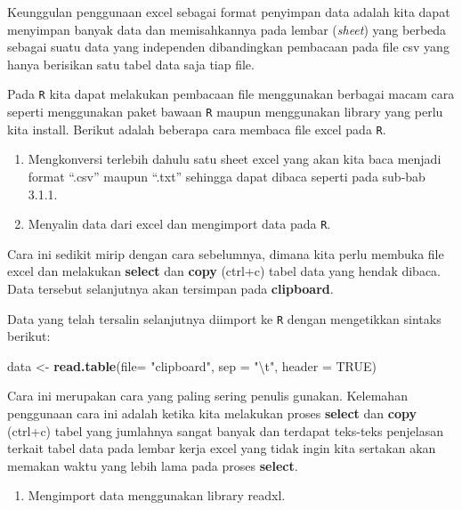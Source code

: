 \documentclass[]{book}
\newenvironment{Shaded}{\begin{snugshade}}{\end{snugshade}}
\newcommand{\KeywordTok}[1]{\textcolor[rgb]{0.13,0.29,0.53}{\textbf{#1}}}
\newcommand{\DataTypeTok}[1]{\textcolor[rgb]{0.13,0.29,0.53}{#1}}
\newcommand{\CharTok}[1]{\textcolor[rgb]{0.31,0.60,0.02}{#1}}
\newcommand{\StringTok}[1]{\textcolor[rgb]{0.31,0.60,0.02}{#1}}
\newcommand{\OtherTok}[1]{\textcolor[rgb]{0.56,0.35,0.01}{#1}}
\newcommand{\NormalTok}[1]{#1}
\providecommand{\tightlist}{%
  \setlength{\itemsep}{0pt}\setlength{\parskip}{0pt}}
\begin{document}
Keunggulan penggunaan excel sebagai format penyimpan data adalah kita
dapat menyimpan banyak data dan memisahkannya pada lembar (\emph{sheet})
yang berbeda sebagai suatu data yang independen dibandingkan pembacaan
pada file csv yang hanya berisikan satu tabel data saja tiap file.

Pada \texttt{R} kita dapat melakukan pembacaan file menggunakan berbagai
macam cara seperti menggunakan paket bawaan \texttt{R} maupun
menggunakan library yang perlu kita install. Berikut adalah beberapa
cara membaca file excel pada \texttt{R}.

\begin{enumerate}
\def\labelenumi{\alph{enumi}.}
\item
  Mengkonversi terlebih dahulu satu sheet excel yang akan kita baca
  menjadi format ``.csv'' maupun ``.txt'' sehingga dapat dibaca seperti
  pada sub-bab 3.1.1.
\item
  Menyalin data dari excel dan mengimport data pada \texttt{R}.
\end{enumerate}

Cara ini sedikit mirip dengan cara sebelumnya, dimana kita perlu membuka
file excel dan melakukan \textbf{select} dan \textbf{copy} (ctrl+c)
tabel data yang hendak dibaca. Data tersebut selanjutnya akan tersimpan
pada \textbf{clipboard}.

Data yang telah tersalin selanjutnya diimport ke \texttt{R} dengan
mengetikkan sintaks berikut:

\begin{Shaded}
\begin{Highlighting}[]
\NormalTok{data <-}\StringTok{ }\KeywordTok{read.table}\NormalTok{(}\DataTypeTok{file=} \StringTok{"clipboard"}\NormalTok{,}
                   \DataTypeTok{sep =} \StringTok{"}\CharTok{\textbackslash{}t}\StringTok{"}\NormalTok{, }\DataTypeTok{header =} \OtherTok{TRUE}\NormalTok{)}
\end{Highlighting}
\end{Shaded}

Cara ini merupakan cara yang paling sering penulis gunakan. Kelemahan
penggunaan cara ini adalah ketika kita melakukan proses \textbf{select}
dan \textbf{copy} (ctrl+c) tabel yang jumlahnya sangat banyak dan
terdapat teks-teks penjelasan terkait tabel data pada lembar kerja excel
yang tidak ingin kita sertakan akan memakan waktu yang lebih lama pada
proses \textbf{select}.

\begin{enumerate}
\def\labelenumi{\alph{enumi}.}
\setcounter{enumi}{2}
\tightlist
\item
  Mengimport data menggunakan library readxl.
\end{enumerate}
\end{document}
